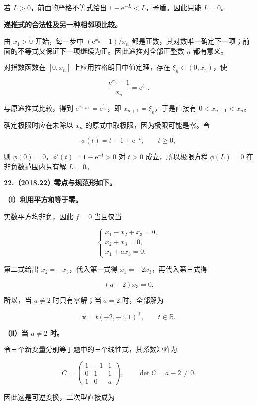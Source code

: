\documentclass[UTF8,11pt,fontset=windows]{ctexart}
\begin{document}
若 $L>0$，前面的严格不等式给出 $1-\mathrm e^{-L}<L$，矛盾。因此只能 $L=0$。

\textbf{递推式的合法性及另一种相邻项比较。}

由 $x_1>0$ 开始，每一步中 $(\mathrm e^{x_n}-1)/x_n$ 都是正数，其对数唯一确定下一项；前面的不等式又保证下一项继续为正。因此递推对全部正整数 $n$ 都有意义。

对指数函数在 $[0,x_n]$ 上应用拉格朗日中值定理，存在 $\xi_n\in(0,x_n)$，使

$$
\frac{\mathrm e^{x_n}-1}{x_n}=\mathrm e^{\xi_n}.
$$

与原递推式比较，得到 $\mathrm e^{x_{n+1}}=\mathrm e^{\xi_n}$，即 $x_{n+1}=\xi_n$，于是直接有 $0<x_{n+1}<x_n$。

确定极限时应在未除以 $x_n$ 的原式中取极限，因为极限可能是零。令

$$
\phi(t)=t-1+\mathrm e^{-t},\qquad t\ge0,
$$

则 $\phi(0)=0$，$\phi'(t)=1-\mathrm e^{-t}>0$ 对 $t>0$ 成立，所以极限方程 $\phi(L)=0$ 在非负数范围内只有解 $L=0$。

\clearpage

\textbf{22.（2018.22）零点与规范形如下。}

\textbf{（Ⅰ）利用平方和等于零。}

实数平方均非负，因此 $f=0$ 当且仅当

$$
\begin{cases}
x_1-x_2+x_3=0,\\
x_2+x_3=0,\\
x_1+ax_3=0.
\end{cases}
$$

第二式给出 $x_2=-x_3$，代入第一式得 $x_1=-2x_3$，再代入第三式得

$$
(a-2)x_3=0.
$$

所以，当 $a\ne2$ 时只有零解；当 $a=2$ 时，全部解为

$$
\boldsymbol x=t(-2,-1,1)^{\mathrm T},\qquad t\in\mathbb R.
$$

\textbf{（Ⅱ）当 $a\ne2$ 时。}

令三个新变量分别等于题中的三个线性式，其系数矩阵为

$$
C=\begin{pmatrix}1&-1&1\\0&1&1\\1&0&a\end{pmatrix},
\qquad \det C=a-2\ne0.
$$

因此这是可逆变换，二次型直接成为
\end{document}
